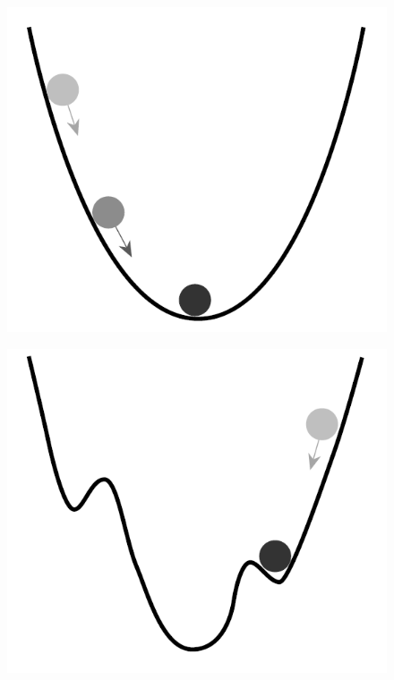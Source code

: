 \begin{figure}
\centering
\begin{minipage}{.5\textwidth}
  \centering
  \includegraphics[width=.4\linewidth]{billeder/globalMinimum.png}
  \label{fig:globalMinimum}
\end{minipage}%
\begin{minipage}{.5\textwidth}
  \centering
  \includegraphics[width=.4\linewidth]{billeder/localMinimum.png}
  \label{fig:localMinimum}
\end{minipage}
\end{figure}

